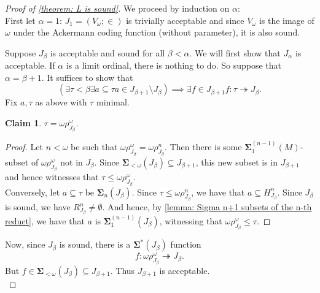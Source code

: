 \documentclass[12pt,a4paper]{article}
\theoremstyle{nicestyle}
\newtheorem{claim}{Claim}[subsection]
\begin{document}
  \begin{proof}[Proof of \autoref{theorem: L is sound}]
    We proceed by induction on $\alpha$: \\
    First let $\alpha = 1$: $J_{1} = (V_{\omega}; \in)$ is trivially
    acceptable and since $V_{\omega}$ is the image of $\omega$ under
    the Ackermann coding function (without parameter), it is also
    sound.

    Suppose $J_{\beta}$ is acceptable and sound for all
    $\beta < \alpha$. We will first show that $J_{\alpha}$ is
    acceptable. If $\alpha$ is a limit ordinal, there is nothing to
    do. So suppose that $\alpha = \beta + 1$. It suffices
    to show that
    \[ (\exists \tau < \beta \exists a \subseteq \tau a \in
      J_{\beta+1} \setminus J_{\beta}) \implies \exists f \in
      J_{\beta + 1} f \colon \tau \twoheadrightarrow J_{\beta}.
    \]
    Fix $a, \tau$ as above with $\tau$ minimal.
    \begin{claim}
      $\tau = \omega \rho^{\omega}_{J_{\beta}}$.
      \end{claim}

      \begin{proof}
        Let $n < \omega$ be such that
        $\omega \rho^{\omega}_{J_{\beta}} = \omega
        \rho^{n}_{J_{\beta}}$. Then there is some
        $\boldsymbol{\Sigma}^{(n-1)}_{1}(M)$-subset of
        $\omega \rho^{\omega}_{J_{\beta}}$ not in $J_{\beta}$. Since
        $\boldsymbol{\Sigma}_{<\omega}(J_{\beta}) \subseteq
        J_{\beta+1}$, this new subset is in $J_{\beta+1}$ and hence
        witnesses that $\tau \leq \omega\rho^{\omega}_{J_{\beta}}$. \\
        Conversely, let $a \subseteq \tau$ be
        $\boldsymbol{\Sigma}_{n}(J_{\beta})$. Since
        $\tau \le \omega\rho^{n}_{J_{\beta}}$, we have that
        $a \subseteq H^{n}_{J_{\beta}}$. Since $J_{\beta}$ is sound,
        we have $R^{n}_{J_{\beta}} \neq \emptyset$. And hence, by
        \autoref{lemma: Sigma n+1 subsets of the n-th reduct}, we have
        that $a$ is $\boldsymbol{\Sigma}^{(n-1)}_{1}(J_{\beta})$,
        witnessing that $\omega\rho^{\omega}_{J_{\beta}} \le \tau$.
      \end{proof}
      Now, since $J_{\beta}$ is sound, there is a
      $\boldsymbol{\Sigma}^{*}(J_{\beta})$ function
      \[
        f \colon \omega\rho^{\omega}_{J_{\beta}} \twoheadrightarrow
        J_{\beta}.
      \]
      But $f \in \boldsymbol{\Sigma}_{<\omega}(J_{\beta})
      \subseteq J_{\beta+1}$. Thus $J_{\beta+1}$ is acceptable. \\


\end{proof}
\end{document}

